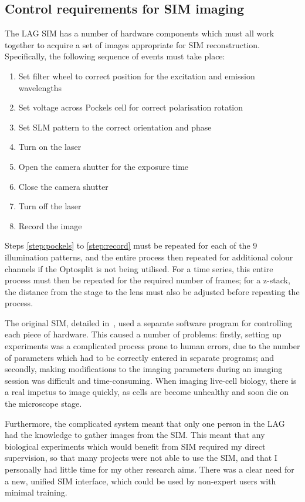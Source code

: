\subsection{Control requirements for SIM imaging} \label{sec:SIMsteps}
The LAG SIM has a number of hardware components which must all work together to acquire a set of images appropriate for SIM reconstruction.
Specifically, the following sequence of events must take place:
\begin{enumerate}
	\item Set filter wheel to correct position for the excitation and emission wavelengths
	\item\label{step:pockels} Set voltage across Pockels cell for correct polarisation rotation
	\item Set SLM pattern to the correct orientation and phase
	\item Turn on the laser
	\item Open the camera shutter for the exposure time
	\item Close the camera shutter
	\item Turn off the laser
	\item\label{step:record} Record the image
\end{enumerate}
Steps \ref{step:pockels} to \ref{step:record} must be repeated for each of the 9 illumination patterns, and the entire process then repeated for additional colour channels if the Optosplit is not being utilised. 
For a time series, this entire process must then be repeated for the required number of frames; for a z-stack, the distance from the stage to the lens must also be adjusted before repeating the process. 

The original SIM, detailed in~\cite{young2016guide}, used a separate software program for controlling each piece of hardware. 
This caused a number of problems: firstly, setting up experiments was a complicated process prone to human errors, due to the number of parameters which had to be correctly entered in separate programs; and secondly, making modifications to the imaging parameters during an imaging session was difficult and time-consuming. 
When imaging live-cell biology, there is a real impetus to image quickly, as cells are become unhealthy and soon die on the microscope stage. 

Furthermore, the complicated system meant that only one person in the LAG had the knowledge to gather images from the SIM. 
This meant that any biological experiments which would benefit from SIM required my direct supervision, so that many projects were not able to use the SIM, and that I personally had little time for my other research aims.
There was a clear need for a new, unified SIM interface, which could be used by non-expert users with minimal training. 


